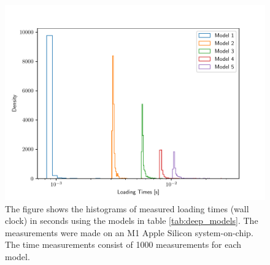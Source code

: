 \begin{figure}[H]
    \centering
    \includegraphics[scale=0.7]{figures/computational_cost/loading_times.pdf}
    \caption{
        The figure shows the histograms of measured loading times (wall clock) in seconds using the models in table \ref{tab:deep_models}. The measurements were made on an M1 Apple Silicon system-on-chip. The time measurements consist of 1000 measurements for each model.
    }
    \label{fig:loading_times}
\end{figure}



